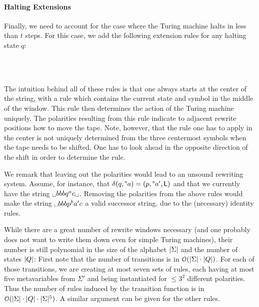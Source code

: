 \documentclass[a4paper,UKenglish,cleveref, autoref]{lipics-v2019}
\newcommand{\TODO}[1]{\ifthenelse{\isundefined{\showTODOs}}{}{\colorbox{red}{\LARGE TODO}:#1}}
\newcommand{\bigO}[1]{\mathcal{O}{(#1)}}
\begin{document}
\paragraph*{Halting Extensions}
Finally, we need to account for the case where the Turing machine halts in less than $t$ steps. For this case, we add the following extension rules for any halting state $q$: 
\begin{center}
   \\[3ex]
   \\[3ex]
\end{center}
\vspace{7ex}
The intuition behind all of these rules is that one always starts at the center of the string, with a rule which contains the current state and symbol in the middle of the window. This rule then determines the action of the Turing machine uniquely. The polarities resulting from this rule indicate to adjacent rewrite positions how to move the tape. Note, however, that the rule one has to apply in the center is not uniquely determined from the three centermost symbols when the tape needs to be shifted. One has to look ahead in the opposite direction of the shift in order to determine the rule. 

We remark that leaving out the polarities would lead to an unsound rewriting system. Assume, for instance, that $\delta(q, \degree a) = (p, \degree a', \textsf{L})$ and that we currently have the string $\blank bbbq^a c \blank$. Removing the polarities from the above rules would make the string $\blank b b b p^b a' c$ a valid successor string, due to the (necessary) identity rules.

While there are a great number of rewrite windows necessary (and one probably does not want to write them down even for simple Turing machines), their number is still polynomial in the size of the alphabet $|\Sigma|$ and the number of states $|Q|$: First note that the number of transitions is in $\bigO{\length{\Sigma} \cdot \length{Q}}$. For each of those transitions, we are creating at most seven sets of rules, each having at most five metavariables from $\Sigma'$ and being instantiated for $\le 3^2$ different polarities. Thus the number of rules induced by the transition function is in $\bigO{\length{\Sigma} \cdot \length{Q} \cdot \length{\Sigma}^5}$. 
A similar argument can be given for the other rules. 
\end{document}
